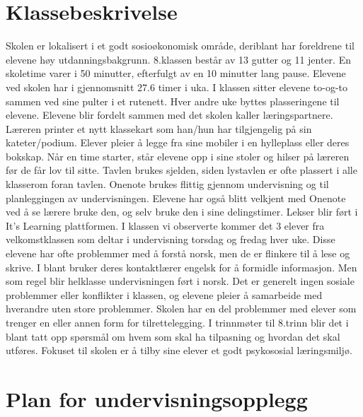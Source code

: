 \documentclass[main.tex]{subfiles}
\begin{document}
\appendix
\section{Klassebeskrivelse}
Skolen er lokalisert i et godt sosioøkonomisk område, deriblant har foreldrene til elevene høy
utdanningsbakgrunn. 8.klassen består av 13 gutter og 11 jenter. En skoletime varer i 50
minutter, efterfulgt av en 10 minutter lang pause. Elevene ved skolen har i gjennomsnitt 27.6
timer i uka. I klassen sitter elevene to-og-to sammen ved sine pulter i et rutenett. Hver andre
uke byttes plasseringene til elevene. Elevene blir fordelt sammen med det skolen kaller
læringspartnere. Læreren printer et nytt klassekart som han/hun har tilgjengelig på sin
kateter/podium. Elever pleier å legge fra sine mobiler i en hylleplass eller deres bokskap. Når en
time starter, står elevene opp i sine stoler og hilser på læreren før de får lov til sitte. Tavlen
brukes sjelden, siden lystavlen er ofte plassert i alle klasserom foran tavlen. Onenote brukes
flittig gjennom undervisning og til planleggingen av undervisningen. Elevene har også blitt
velkjent med Onenote ved å se lærere bruke den, og selv bruke den i sine delingstimer. Lekser
blir ført i It’s Learning plattformen. I klassen vi observerte kommer det 3 elever fra
velkomstklassen som deltar i undervisning torsdag og fredag hver uke. Disse elevene har ofte
problemmer med å forstå norsk, men de er flinkere til å lese og skrive. I blant bruker deres
kontaktlærer engelsk for å formidle informasjon. Men som regel blir helklasse undervisningen
ført i norsk. Det er generelt ingen sosiale problemmer eller konflikter i klassen, og elevene pleier
å samarbeide med hverandre uten store problemmer. Skolen har en del problemmer med
elever som trenger en eller annen form for tilrettelegging. I trinnmøter til 8.trinn blir det i blant tatt
opp spørsmål om hvem som skal ha tilpasning og hvordan det skal utføres. Fokuset til skolen er
å tilby sine elever et godt psykososial læringsmiljø.

\newpage\null
\section{Plan for undervisningsopplegg}
\end{document}
